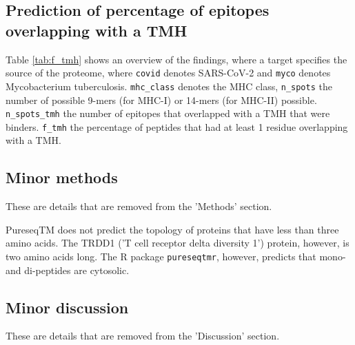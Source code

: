 \subsection{Prediction of percentage of epitopes overlapping with a TMH}

Table \ref{tab:f_tmh} shows an overview of the findings,
where a target specifies the source of the proteome,
where \verb;covid; denotes SARS-CoV-2 and \verb;myco; denotes
Mycobacterium tuberculosis. \verb;mhc_class; denotes the MHC
class, \verb;n_spots; the number of possible 9-mers (for MHC-I) 
or 14-mers (for MHC-II) possible. \verb;n_spots_tmh; the
number of epitopes that overlapped with a TMH that were binders. 
\verb;f_tmh; the percentage of peptides that had at least 1 residue
overlapping with a TMH.



\subsection{Minor methods}

These are details that are removed from the 'Methods' section.

PureseqTM does not predict the topology
of proteins that have less than three amino acids. 
The TRDD1 ('T cell receptor delta diversity 1') protein,
however, is two amino acids long. 
The R package \verb;pureseqtmr;, however, 
predicts that mono- and di-peptides are cytosolic. 

\subsection{Minor discussion}

These are details that are removed from the 'Discussion' section.


